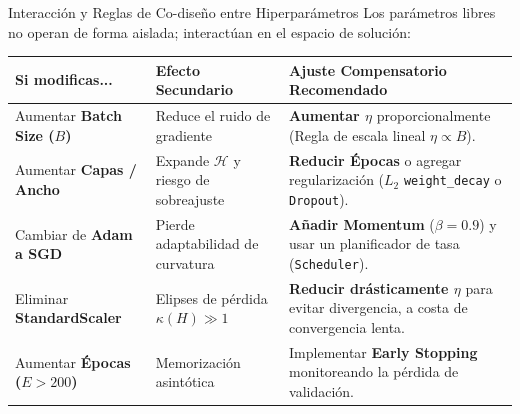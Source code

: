 \documentclass[10pt,aspectratio=169]{beamer}
\begin{document}
\begin{frame}{Interacción y Reglas de Co-diseño entre Hiperparámetros}
  Los parámetros libres no operan de forma aislada; interactúan en el espacio de solución:
  \vspace{0.15cm}

  \begin{center}
    \scriptsize
    \begin{tabular}{p{2.8cm} p{3.2cm} p{5.8cm}}
      \toprule
      \textbf{Si modificas...} & \textbf{Efecto Secundario} & \textbf{Ajuste Compensatorio Recomendado} \\
      \midrule
      Aumentar \textbf{Batch Size ($B$)} & Reduce el ruido de gradiente & \textbf{Aumentar $\eta$} proporcionalmente (Regla de escala lineal $\eta \propto B$). \\
      \addlinespace
      Aumentar \textbf{Capas / Ancho} & Expande $\mathcal{H}$ y riesgo de sobreajuste & \textbf{Reducir Épocas} o agregar regularización ($L_2$ \texttt{weight\_decay} o \texttt{Dropout}). \\
      \addlinespace
      Cambiar de \textbf{Adam a SGD} & Pierde adaptabilidad de curvatura & \textbf{Añadir Momentum} ($\beta=0.9$) y usar un planificador de tasa (\texttt{Scheduler}). \\
      \addlinespace
      Eliminar \textbf{StandardScaler} & Elipses de pérdida $\kappa(H) \gg 1$ & \textbf{Reducir drásticamente $\eta$} para evitar divergencia, a costa de convergencia lenta. \\
      \addlinespace
      Aumentar \textbf{Épocas ($E > 200$)} & Memorización asintótica & Implementar \textbf{Early Stopping} monitoreando la pérdida de validación. \\
      \bottomrule
    \end{tabular}
  \end{center}
\end{frame}
\end{document}
